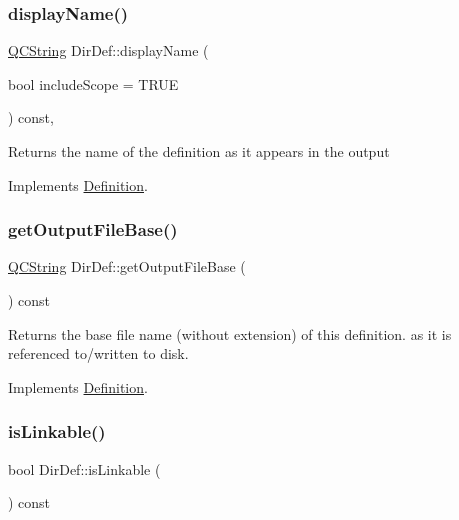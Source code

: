\mbox{\label{class_dir_def_a2771a73e6f4be26be57f2c71f097126c}} 
\subsubsection{\texorpdfstring{displayName()}{displayName()}}
{\footnotesize\ttfamily \mbox{\hyperlink{class_q_c_string}{Q\+C\+String}} Dir\+Def\+::display\+Name (\begin{DoxyParamCaption}\item[{bool}]{include\+Scope = {\ttfamily TRUE} }\end{DoxyParamCaption}) const\hspace{0.3cm}{\ttfamily [inline]}, {\ttfamily [virtual]}}

Returns the name of the definition as it appears in the output 

Implements \mbox{\hyperlink{class_definition_ac4741f70f06baac174cf71b3e11d06ac}{Definition}}.

\mbox{\label{class_dir_def_a345c9c6a02715cf7d81315e4154a4a0d}} 
\subsubsection{\texorpdfstring{getOutputFileBase()}{getOutputFileBase()}}
{\footnotesize\ttfamily \mbox{\hyperlink{class_q_c_string}{Q\+C\+String}} Dir\+Def\+::get\+Output\+File\+Base (\begin{DoxyParamCaption}{ }\end{DoxyParamCaption}) const\hspace{0.3cm}{\ttfamily [virtual]}}

Returns the base file name (without extension) of this definition. as it is referenced to/written to disk. 

Implements \mbox{\hyperlink{class_definition_acabecdc6bfda2015811eed5f3436322d}{Definition}}.

\mbox{\label{class_dir_def_a7f8f2ffe405a82ee00982ccf7d1fd750}} 
\subsubsection{\texorpdfstring{isLinkable()}{isLinkable()}}
{\footnotesize\ttfamily bool Dir\+Def\+::is\+Linkable (\begin{DoxyParamCaption}{ }\end{DoxyParamCaption}) const\hspace{0.3cm}{\ttfamily [virtual]}}

